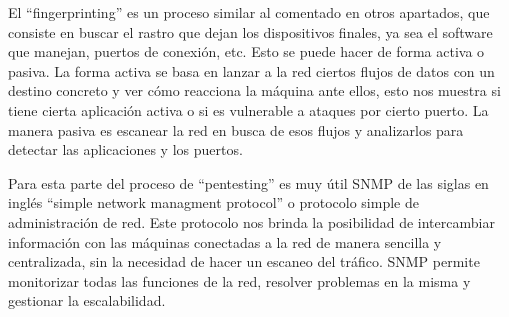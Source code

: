 El “fingerprinting” es un proceso similar al comentado en otros apartados, que consiste en buscar el rastro que dejan los dispositivos finales, ya sea el software que manejan, puertos de conexión, etc. Esto se puede hacer de forma activa o pasiva. La forma activa se basa en lanzar a la red ciertos flujos de datos con un destino concreto y ver cómo reacciona la máquina ante ellos, esto nos muestra si tiene cierta aplicación activa o si es vulnerable a ataques por cierto puerto. La manera pasiva es escanear la red en busca de esos flujos y analizarlos para detectar las aplicaciones y los puertos.
\bigskip

Para esta parte del proceso de “pentesting” es muy útil SNMP de las siglas en inglés “simple network managment protocol” o protocolo simple de administración de red. Este protocolo nos brinda la posibilidad de intercambiar información con las máquinas conectadas a la red de manera sencilla y centralizada, sin la necesidad de hacer un escaneo del tráfico. SNMP permite monitorizar todas las funciones de la red, resolver problemas en la misma y gestionar la escalabilidad.